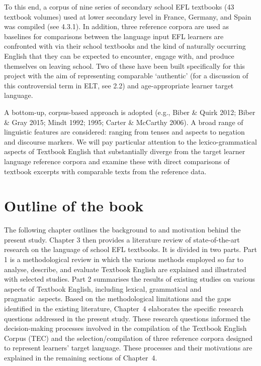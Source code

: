 \documentclass[
  letterpaper,
  DIV=11,
  numbers=noendperiod]{scrreprt}
\begin{document}
To this end, a corpus of nine series of secondary school EFL textbooks
(43 textbook volumes) used at lower secondary level in France, Germany,
and Spain was compiled (see 4.3.1). In addition, three reference corpora
are used as baselines for comparisons between the language input EFL
learners are confronted with via their school textbooks and the kind of
naturally occurring English that they can be expected to encounter,
engage with, and produce themselves on leaving school. Two of these have
been built specifically for this project with the aim of representing
comparable `authentic' (for a discussion of this controversial term in
ELT, see 2.2) and age-appropriate learner target language.

A bottom-up, corpus-based approach is adopted (e.g., Biber \& Quirk
2012; Biber \& Gray 2015; Mindt 1992; 1995; Carter \& McCarthy 2006). A
broad range of linguistic features are considered: ranging from tenses
and aspects to negation and discourse markers. We will pay particular
attention to the lexico-grammatical aspects of Textbook English that
substantially diverge from the target learner language reference corpora
and examine these with direct comparisons of textbook excerpts with
comparable texts from the reference data.

\section{Outline of the book}\label{outline-of-the-book}

The following chapter outlines the background to and motivation behind
the present study. Chapter 3 then provides a literature review of
state-of-the-art research on the language of school EFL textbooks. It is
divided in two parts. Part 1 is a methodological review in which the
various methods employed so far to analyse, describe, and evaluate
Textbook English are explained and illustrated with selected studies.
Part 2 summarises the results of existing studies on various aspects of
Textbook English, including lexical, grammatical and pragmatic~aspects.
Based on the methodological limitations and the gaps identified in the
existing literature, Chapter~4 elaborates the specific research
questions addressed in the present study. These research questions
informed the decision-making processes involved in the compilation of
the Textbook English Corpus (TEC) and the selection/compilation of three
reference corpora designed to represent learners' target language. These
processes and their motivations are explained in the remaining sections
of Chapter~4.
\end{document}
